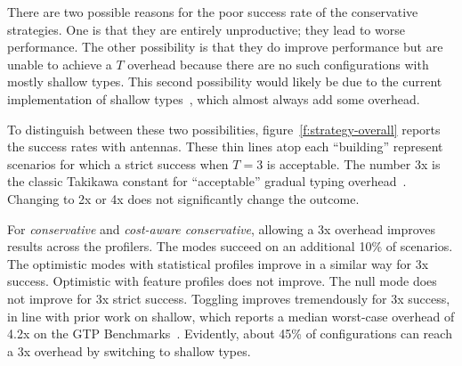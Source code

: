 There are two possible reasons for the poor success rate of the conservative
strategies.
One is that they are entirely unproductive; they lead to worse performance.
The other possibility is that they do improve performance but are unable
to achieve a $T$ overhead because there are no such configurations with
mostly shallow types.
This second possibility would likely be due to the current implementation of shallow
types~\cite{g-deep-shallow}, which almost always add some overhead.

To distinguish between these two possibilities, figure~\ref{f:strategy-overall}
reports the success rates with antennas. These thin lines atop each ``building''
represent scenarios for which a strict success when $T = 3$ is acceptable.  The
number 3x is the classic Takikawa constant for ``acceptable'' gradual typing
overhead~\cite{vss-popl-2017,bbst-oopsla-2017}.  Changing to 2x or 4x does not
significantly change the outcome.

For \emph{conservative} and \emph{cost-aware conservative}, allowing a 3x
overhead improves results across the profilers. The modes succeed on an
additional 10\% of scenarios.  The optimistic modes with statistical profiles
improve in a similar way for 3x success.  Optimistic with feature profiles does
not improve.  The null mode does not improve for 3x strict success.  Toggling
improves tremendously for 3x success, in line with prior work on shallow, which
reports a median worst-case overhead of 4.2x on the GTP
Benchmarks~\cite{g-deep-shallow}.  Evidently, about 45\% of configurations can
reach a 3x overhead by switching to shallow types.

